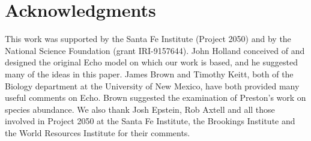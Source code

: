 %
%
%
%
%
%
%


\section{Acknowledgments}

This work was supported by the Santa Fe Institute (Project 2050) and
by the National Science Foundation (grant IRI-9157644). John Holland
conceived of and designed the original Echo model on which our work is
based, and he suggested many of the ideas in this paper.  James Brown
and Timothy Keitt, both of the Biology department at the University of
New Mexico, have both provided many useful comments on Echo.  Brown
suggested the examination of Preston's work on species abundance. We
also thank Josh Epstein, Rob Axtell and all those involved in Project
2050 at the Santa Fe Institute, the Brookings Institute and the World
Resources Institute for their comments.






